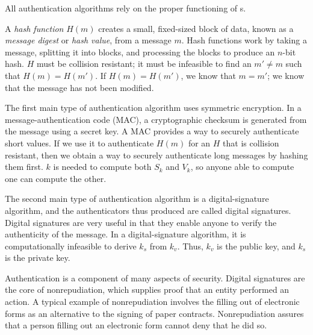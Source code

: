 All authentication algorithms rely on the proper functioning of s.
\begin{definition}\label{def:Hash_Function}
  A \emph{hash function} $H(m)$ creates a small, fixed-sized block of data, known as a \emph{message digest} or \emph{hash value}, from a message $m$.
  Hash functions work by taking a message, splitting it into blocks, and processing the blocks to produce an $n$-bit hash.
  $H$ must be collision resistant; it must be infeasible to find an $m' \neq m$ such that $H(m) = H(m')$.
  If $H(m) = H(m')$, we know that $m = m'$; we know that the message has not been modified.
\end{definition}

The first main type of authentication algorithm uses symmetric encryption.
In a message-authentication code (MAC), a cryptographic checksum is generated from the message using a secret key.
A MAC provides a way to securely authenticate short values.
If we use it to authenticate $H(m)$ for an $H$ that is collision resistant, then we obtain a way to securely authenticate long messages by hashing them first.
$k$ is needed to compute both $S_{k}$ and $V_{k}$, so anyone able to compute one can compute the other.

The second main type of authentication algorithm is a digital-signature algorithm, and the authenticators thus produced are called digital signatures.
Digital signatures are very useful in that they enable anyone to verify the authenticity of the message.
In a digital-signature algorithm, it is computationally infeasible to derive $k_{s}$ from $k_{v}$.
Thus, $k_{v}$ is the public key, and $k_{s}$ is the private key.

Authentication is a component of many aspects of security.
Digital signatures are the core of nonrepudiation, which supplies proof that an entity performed an action.
A typical example of nonrepudiation involves the filling out of electronic forms as an alternative to the signing of paper contracts.
Nonrepudiation assures that a person filling out an electronic form cannot deny that he did so.


